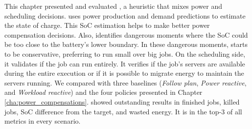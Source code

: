 This chapter presented and evaluated \emph{\systemName}, a heuristic that mixes power and scheduling decisions. \emph{\systemName} uses power production and demand predictions to estimate the state of charge. This SoC estimation helps to make better power compensation decisions. Also, \emph{\systemName} identifies dangerous moments where the SoC could be too close to the battery's lower boundary. In these dangerous moments, \emph{\systemName} starts to be conservative, preferring to run small over big jobs. On the scheduling side, it validates if the job can run entirely. It verifies if the job's servers are available during the entire execution or if it is possible to migrate energy to maintain the servers running. We compared \emph{\systemName} with three baselines (\emph{Follow plan}, \emph{Power reactive}, and \emph{Workload reactive}) and the four policies presented in Chapter \ref{cha:power_compensations}. \emph{\systemName} showed outstanding results in finished jobs, killed jobs, SoC difference from the target, and wasted energy. It is in the top-3 of all metrics in every scenario. 
